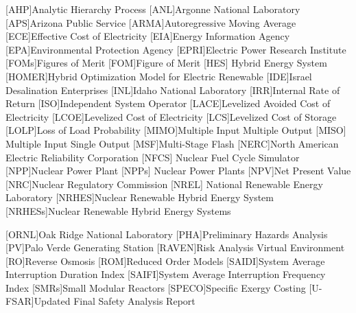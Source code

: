 \documentclass[12pt]{UIdahoMastersThesis}
\begin{document}
\begin{acronym}[NRHES]  %
	[AHP]{Analytic Hierarchy Process}
    [ANL]{Argonne National Laboratory}
    [APS]{Arizona Public Service}
    [ARMA]{Autoregressive Moving Average}
    [ECE]{Effective Cost of Electricity}
    [EIA]{Energy Information Agency}
    [EPA]{Environmental Protection Agency}
    [EPRI]{Electric Power Research Institute}
    [FOMs]{Figures of Merit}
    [FOM]{Figure of Merit}
    [HES] {Hybrid Energy System}
    [HOMER]{Hybrid Optimization Model for Electric Renewable}
    [IDE]{Israel Desalination Enterprises}
    [INL]{Idaho National Laboratory}
    [IRR]{Internal Rate of Return}
    [ISO]{Independent System Operator}
    [LACE]{Levelized Avoided Cost of Electricity}
    [LCOE]{Levelized Cost of Electricity}
    [LCS]{Levelized Cost of Storage}
    [LOLP]{Loss of Load Probability}
    [MIMO]{Multiple Input Multiple Output}
    [MISO] {Multiple Input Single Output}
    [MSF]{Multi-Stage Flash}
    [NERC]{North American Electric Reliability Corporation}
    [NFCS] {Nuclear Fuel Cycle Simulator}
    [NPP]{Nuclear Power Plant}
    [NPPs] {Nuclear Power Plants}
    [NPV]{Net Present Value}
    [NRC]{Nuclear Regulatory Commission}
     [NREL] {National Renewable Energy Laboratory}
    [NRHES]{Nuclear Renewable Hybrid Energy System}
    [NRHESs]{Nuclear Renewable Hybrid Energy Systems}

    [ORNL]{Oak Ridge National Laboratory}
    [PHA]{Preliminary Hazards Analysis}
    [PV]{Palo Verde Generating Station}
    [RAVEN]{Risk Analysis Virtual Environment}
    [RO]{Reverse Osmosis}
    [ROM]{Reduced Order Models}
    [SAIDI]{System Average Interruption Duration Index}
    [SAIFI]{System Average Interruption Frequency Index}
    [SMRs]{Small Modular Reactors}
    [SPECO]{Specific Exergy Costing}
    [U-FSAR]{Updated Final Safety Analysis Report}
\end{acronym}
\end{document}
